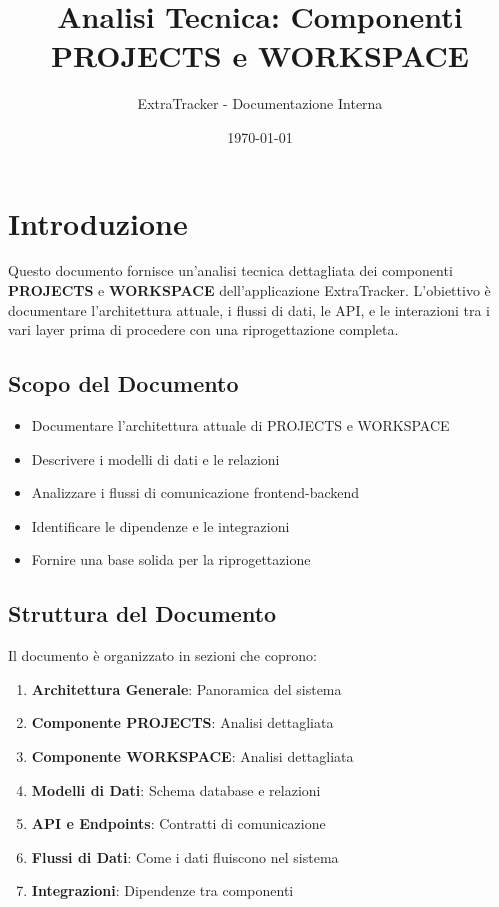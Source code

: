 \documentclass[11pt,a4paper]{article}
\title{\textbf{Analisi Tecnica: Componenti PROJECTS e WORKSPACE}}
\author{ExtraTracker - Documentazione Interna}
\date{\today}
\begin{document}
\maketitle
\tableofcontents
\newpage

\section{Introduzione}

Questo documento fornisce un'analisi tecnica dettagliata dei componenti \textbf{PROJECTS} e \textbf{WORKSPACE} dell'applicazione ExtraTracker. L'obiettivo è documentare l'architettura attuale, i flussi di dati, le API, e le interazioni tra i vari layer prima di procedere con una riprogettazione completa.

\subsection{Scopo del Documento}

\begin{itemize}
    \item Documentare l'architettura attuale di PROJECTS e WORKSPACE
    \item Descrivere i modelli di dati e le relazioni
    \item Analizzare i flussi di comunicazione frontend-backend
    \item Identificare le dipendenze e le integrazioni
    \item Fornire una base solida per la riprogettazione
\end{itemize}

\subsection{Struttura del Documento}

Il documento è organizzato in sezioni che coprono:
\begin{enumerate}
    \item \textbf{Architettura Generale}: Panoramica del sistema
    \item \textbf{Componente PROJECTS}: Analisi dettagliata
    \item \textbf{Componente WORKSPACE}: Analisi dettagliata
    \item \textbf{Modelli di Dati}: Schema database e relazioni
    \item \textbf{API e Endpoints}: Contratti di comunicazione
    \item \textbf{Flussi di Dati}: Come i dati fluiscono nel sistema
    \item \textbf{Integrazioni}: Dipendenze tra componenti
\end{enumerate}
\end{document}
